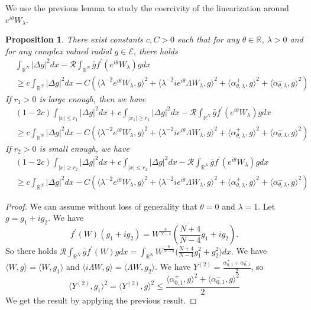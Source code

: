 \documentclass[a4paper,two-side,10pt]{amsart}
\newtheorem{prop}{Proposition}[section]
\newcommand{\R}{\mathbb{R}}
\numberwithin{equation}{section}
\begin{document}
We use the previous lemma to study the coercivity of the linearization around $e^{i\theta} W_\lambda$.
\begin{prop}
\label{propcoer111}
There exist constants $c,C>0$ such that for any $\theta \in \R$, $\lambda >0$ and for any complex valued radial $g\in \mathcal{E}$, there holds
\begin{align*}
&\int_{\R^N} |\Delta g|^2 dx - \mathcal{R} \int_{\R^N} \bar{g} f^\prime (e^{i\theta} W_\lambda) g dx\\
& \geq c \int_{\R^N} |\Delta g|^2 dx - C (\langle \lambda^{-2} e^{i\theta} W_\lambda , g\rangle^2 + \langle \lambda^{-2} i e^{i\theta} \Lambda W_\lambda ,g \rangle^2 +\langle \alpha_{\theta ,\lambda}^+ ,g \rangle^2 +\langle \alpha_{\theta ,\lambda}^- ,g\rangle^2)
\end{align*}
If $r_1 >0$ is large enough, then we have
\begin{align*}
&(1-2c)\int_{|x|\leq r_1} |\Delta g|^2 dx+c \int_{|x_1| \geq r_1} |\Delta g|^2 dx - \mathcal{R} \int_{\R^N} \bar{g} f^\prime (e^{i\theta} W_\lambda) g dx\\
& \geq c \int_{\R^N} |\Delta g|^2 dx - C (\langle \lambda^{-2} e^{i\theta} W_\lambda , g\rangle^2 + \langle \lambda^{-2} i e^{i\theta} \Lambda W_\lambda ,g \rangle^2 +\langle \alpha_{\theta ,\lambda}^+ ,g \rangle^2 +\langle \alpha_{\theta ,\lambda}^- ,g\rangle^2)
\end{align*}
If $r_2>0$ is small enough, we have
\begin{align*}
&(1-2c)\int_{|x|\geq r_2} |\Delta g|^2 dx+c\int_{|x|\leq r_2} |\Delta g|^2 dx - \mathcal{R} \int_{\R^N} \bar{g} f^\prime (e^{i\theta} W_\lambda) g dx\\
& \geq c \int_{\R^N} |\Delta g|^2 dx - C (\langle \lambda^{-2} e^{i\theta} W_\lambda , g\rangle^2 + \langle \lambda^{-2} i e^{i\theta} \Lambda W_\lambda ,g \rangle^2 +\langle \alpha_{\theta ,\lambda}^+ ,g \rangle^2 +\langle \alpha_{\theta ,\lambda}^- ,g\rangle^2)
\end{align*}

\end{prop}
 \begin{proof}
We can assume without loss of generality that $\theta=0$ and $\lambda =1$. Let $g=g_1 +i g_2$. We have
$$f^\prime (W) (g_1 +ig_2)=W^{\frac{8}{N-4}} \left(\frac{N+4}{N-4} g_1 +i  g_2 \right).$$
So there holds $\mathcal{R} \int_{\R^N} \bar{g} f^\prime (W) g dx = \int_{\R^N } W^{\frac{8}{N-4}} \big(\frac{N+4}{N-4}  g_1^2 + g_2^2\big) dx.$ We have $\langle W,g\rangle = \langle W ,g_1\rangle$ and $\langle i \Lambda W,g\rangle = \langle \Lambda W ,g_2\rangle$. We have $Y^{(2)} = \frac{\alpha_{0,1}^+ +\alpha_{0,1}^- }{2}$, so
$$\langle Y^{(2)} ,g_1 \rangle^2 = \langle Y^{(2)} ,g \rangle^2 \leq \frac{\langle \alpha_{0,1}^+ ,g\rangle^2 +\langle \alpha_{0,1}^- ,g\rangle^2 }{2} $$
We get the result by applying the previous result.
\end{proof}
\end{document}

